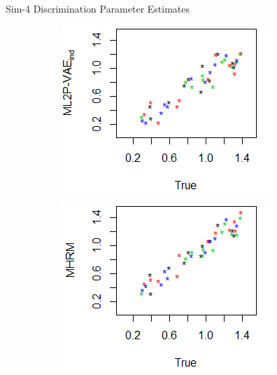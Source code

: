 \documentclass{beamer}
\theoremstyle{definition}
\begin{document}
\begin{frame}{Sim-4 Discrimination Parameter Estimates}
\begin{figure}[h]
\begin{subfigure}{.32\textwidth}
      \centering
      \includegraphics[width=.9\linewidth]{../img/ml_journal_results/4skills/vae_ind_disc_4skills_cropped.png}
    \end{subfigure}
    \begin{subfigure}{.32\textwidth}
      \centering
      \includegraphics[width=.9\linewidth]{../img/ml_journal_results/4skills/mhrm_disc_4skills_cropped.png}
    \end{subfigure}
    \begin{subfigure}{.32\textwidth}
      \centering

\end{subfigure}
\end{figure}
\end{frame}
\end{document}
